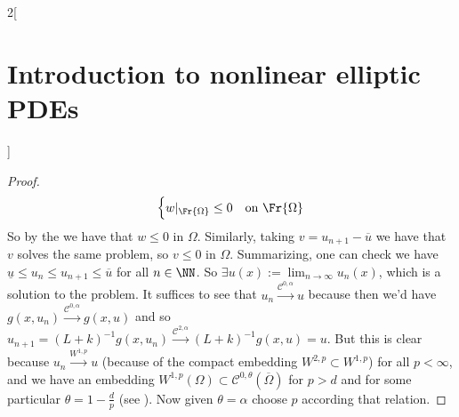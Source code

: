 \documentclass[../../../main_math.tex]{subfiles}
\begin{document}
\begin{multicols}{2}[\section{Introduction to nonlinear elliptic PDEs}]
\begin{proof}
$$\begin{cases}
        w|_{\Fr{\Omega}}\leq 0 & \text{on }\Fr{\Omega}
      \end{cases}
    $$
    So by the  we have that $w\leq 0$ in $\Omega$. Similarly, taking $v=u_{n+1}-\overline{u}$ we have that $v$ solves the same problem, so $v\leq 0$ in $\Omega$. Summarizing, one can check we have $\underline{u}\leq u_n\leq u_{n+1}\leq \overline{u}$ for all $n\in\NN$. So $\displaystyle\exists u(x):=\lim_{n\to\infty}u_n(x)$, which is a solution to the problem. It suffices to see that $u_n\overset{\mathcal{C}^{0,\alpha}}{\longrightarrow} u$ because then we'd have $g(x,u_n) \overset{\mathcal{C}^{0,\alpha}}{\longrightarrow} g(x,u)$ and so $u_{n+1}= (L+k)^{-1}g(x,u_n) \overset{\mathcal{C}^{2,\alpha}}{\longrightarrow} (L+k)^{-1}g(x,u)=u$. But this is clear because $u_n\overset{W^{1,p}}{\longrightarrow} u$ (because of the compact embedding $W^{2,p}\subset W^{1,p}$) for all $p<\infty$, and we have an embedding $W^{1,p}(\Omega)\subset \mathcal{C}^{0,\theta}(\overline{\Omega})$ for $p>d$ and for some particular $\theta=1-\frac{d}{p}$ (see ). Now given $\theta=\alpha$ choose $p$ according that relation.
  \end{proof}

\end{multicols}
\end{document}
